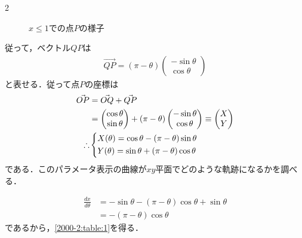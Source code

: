 \documentclass[../../main.tex]{subfiles}
\begin{document}
\begin{multicols}{2}
\begin{figure}[H]
\begin{tikzpicture}[scale=1.5]
    \end{tikzpicture}
    \caption{$x\le 1$での点$P$の様子}
    \label{2000-2:fig:2}
  \end{figure}

  従って，ベクトル$QP$は
  \begin{align*}
    \vec{QP} = (\pi-\theta)
    \begin{pmatrix}
      -\sin\theta \\
      \cos\theta
    \end{pmatrix}
  \end{align*}
  と表せる．従って点$P$の座標は
  \begin{align}
    \vec{OP}
     & = \vec{OQ} + \vec{QP}       \nonumber           \\
     & =
    \begin{pmatrix}
      \cos\theta \\
      \sin\theta
    \end{pmatrix}
    + (\pi-\theta)
    \begin{pmatrix}
      -\sin\theta \\
      \cos\theta
    \end{pmatrix}
    \equiv
    \begin{pmatrix}
      X \\
      Y
    \end{pmatrix}       \nonumber                      \\
    \therefore
     & \begin{dcases}
         X(\theta) = \cos\theta - (\pi-\theta)\sin\theta \\
         Y(\theta) = \sin\theta + (\pi-\theta)\cos\theta
       \end{dcases}\label{2000-2:eq:1}
  \end{align}
  である．このパラメータ表示の曲線が$xy$平面でどのような軌跡になるかを調べる．

  \begin{align}
    \frac{dx}{d\theta}
     & = -\sin\theta - (\pi-\theta)\cos\theta + \sin\theta \nonumber \\
     & = -(\pi-\theta) \cos\theta  \label{2000-2:eq:2}
  \end{align}
  であるから，\cref{2000-2:table:1}を得る．


\end{multicols}
\end{document}
